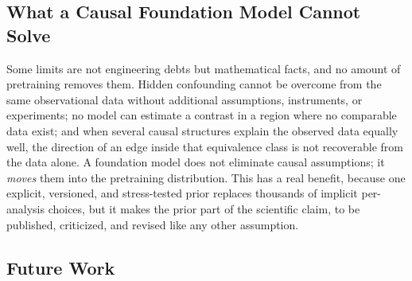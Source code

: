 \documentclass[electronics,article,submit,oneauthor]{Definitions/mdpi}
\begin{document}
\subsection{What a Causal Foundation Model Cannot Solve}\label{sec:discussion-cannot}

Some limits are not engineering debts but mathematical facts, and no amount of pretraining removes them. Hidden confounding cannot be overcome from the same observational data without additional assumptions, instruments, or experiments; no model can estimate a contrast in a region where no comparable data exist; and when several causal structures explain the observed data equally well, the direction of an edge inside that equivalence class is not recoverable from the data alone. A foundation model does not eliminate causal assumptions; it \emph{moves} them into the pretraining distribution. This has a real benefit, because one explicit, versioned, and stress-tested prior replaces thousands of implicit per-analysis choices, but it makes the prior part of the scientific claim, to be published, criticized, and revised like any other assumption.

\subsection{Future Work}\label{sec:discussion-future}
\end{document}
